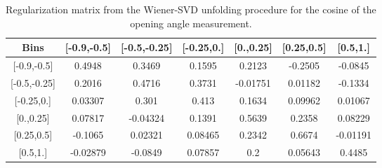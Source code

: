 \documentclass[amsmath,amssymb,aps,prd,showpacs,twocolumn,superscriptaddress,letterpaper,longbibliography, floatfix]{revtex4-2}
\begin{document}
\FloatBarrier
\begin{table}[H]
\caption{Regularization matrix from the Wiener-SVD unfolding procedure for the cosine of the opening angle measurement.} \label{tbl:ACAep}
\begin{center} \begin{tabular}{|c|c|c|c|c|c|c|}
\hline
Bins & [-0.9,-0.5] & [-0.5,-0.25]& [-0.25,0.]& [0.,0.25]& [0.25,0.5]& [0.5,1.]\\\hline
{[-0.9,-0.5]} &0.4948 &	0.3469&0.1595	&0.2123	&-0.2505	& -0.0845 \\
{[-0.5,-0.25]}  & 0.2016&0.4716	&0.3731	&-0.01751  	&0.01182	&   -0.1334 \\
{[-0.25,0.]} &0.03307&0.301	&0.413	&0.1634	&0.09962&0.01067\\
{[0.,0.25]}  & 0.07817&-0.04324	&0.1391	&0.5639	&0.2358	&0.08229\\
{[0.25,0.5]}  & -0.1065 &0.02321	&0.08465	&0.2342	&0.6674	&-0.01191 \\
{[0.5,1.]}  & -0.02879 &-0.0849	&0.07857	&0.2&	0.05643&0.4485\\
\hline
\end{tabular} \end{center}
\end{table}


\FloatBarrier
\twocolumngrid


\end{document}
